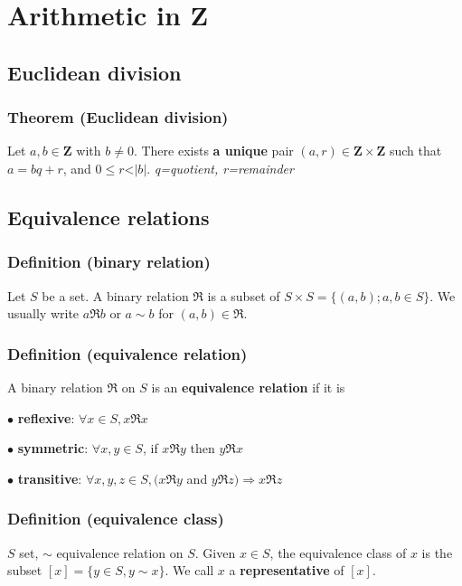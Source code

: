 \section{Arithmetic in $\mathbf{Z}$}
		\subsection{Euclidean division}
			\subsubsection{Theorem (Euclidean division)}
				Let $a,b \in \mathbf{Z}$ with $b \neq 0$. There exists \textbf{a unique} pair $(a,r) \in \mathbf{Z} \times \mathbf{Z}$ such that $a=bq+r$, and $0\leq r$\textless $|b|$. \textit{q=quotient, r=remainder}
				
		\subsection{Equivalence relations}
			\subsubsection{Definition (binary relation)}
				Let $S$ be a set. A binary relation $\mathfrak{R}$ is a subset of $S \times S = \{(a,b); a,b \in S \}$. We usually write $a \mathfrak{R} b$ or $a \sim b$ for $(a,b) \in \mathfrak{R}$.
				
			\subsubsection{Definition (equivalence relation)}
			A binary relation $\mathfrak{R}$ on $S$ is an \textbf{equivalence relation} if it is
			
				$\bullet$ \textbf{reflexive}: $\forall x \in S, x\mathfrak{R}x$
    
                $\bullet$ \textbf{symmetric}: $\forall x,y \in S$, if $x\mathfrak{R}y$ then $y\mathfrak{R}x$

                $\bullet$ \textbf{transitive}: $\forall x,y,z \in S, (x\mathfrak{R}y$ and $y\mathfrak{R}z) \Rightarrow x\mathfrak{R}z$
				
			\subsubsection{Definition (equivalence class)}
            $S$ set, $\sim$ equivalence relation on $S$. Given $x\in S$, the equivalence class of $x$ is the subset $[x]=\{y\in S, y \sim x \}$.
            We call $x$ a \textbf{representative} of $[x]$.

